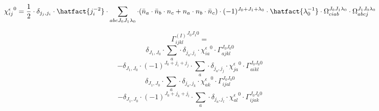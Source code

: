 
\begin{dmath*}
{\chi^{\epsilon}_{i j}}^{0} = \frac{1}{2} \cdot \delta_{{j}_{j},{j}_{i}} \cdot \hatfact{{j}_{i}^{-2}} \cdot \sum_{a b c {J}_{0} {J}_{1} {{\lambda}}_{0}} \cdot (\bar{n}_{a} \cdot \bar{n}_{b} \cdot n_{c} + n_{a} \cdot n_{b} \cdot \bar{n}_{c}) \cdot (-1)^{{J}_{0}+{J}_{1}+{{\lambda}}_{0}} \cdot \hatfact{{{\lambda}}_{0}^{-1}} \cdot \Omega_{c i a b}^{{J}_{0} {J}_{1} {{\lambda}}_{0}} \cdot \Omega_{a b c j}^{{J}_{1} {J}_{0} {{\lambda}}_{0}}
\end{dmath*}

\begin{dmath*}
{\Gamma^{(I)}_{i j k l}}^{{J}_{0} {J}_{1} 0} = 
\end{dmath*}
\begin{dmath*}
\delta_{{J}_{1},{J}_{0}} \cdot \sum_{a} \cdot \delta_{{j}_{a},{j}_{i}} \cdot {\chi^{\epsilon}_{i a}}^{0} \cdot \Gamma_{a j k l}^{{J}_{0} {J}_{0} 0}
\end{dmath*}
\begin{dmath*}
-\delta_{{J}_{1},{J}_{0}} \cdot (-1)^{{J}_{0}+{j}_{i}+{j}_{j}} \cdot \sum_{a} \cdot \delta_{{j}_{a},{j}_{j}} \cdot {\chi^{\epsilon}_{j a}}^{0} \cdot \Gamma_{a i k l}^{{J}_{0} {J}_{0} 0}
\end{dmath*}
\begin{dmath*}
\delta_{{J}_{1},{J}_{0}} \cdot \sum_{a} \cdot \delta_{{j}_{a},{j}_{k}} \cdot {\chi^{\epsilon}_{a k}}^{0} \cdot \Gamma_{i j a l}^{{J}_{0} {J}_{0} 0}
\end{dmath*}
\begin{dmath*}
-\delta_{{J}_{1},{J}_{0}} \cdot (-1)^{{J}_{0}+{j}_{k}+{j}_{l}} \cdot \sum_{a} \cdot \delta_{{j}_{a},{j}_{l}} \cdot {\chi^{\epsilon}_{a l}}^{0} \cdot \Gamma_{i j a k}^{{J}_{0} {J}_{0} 0}
\end{dmath*}

